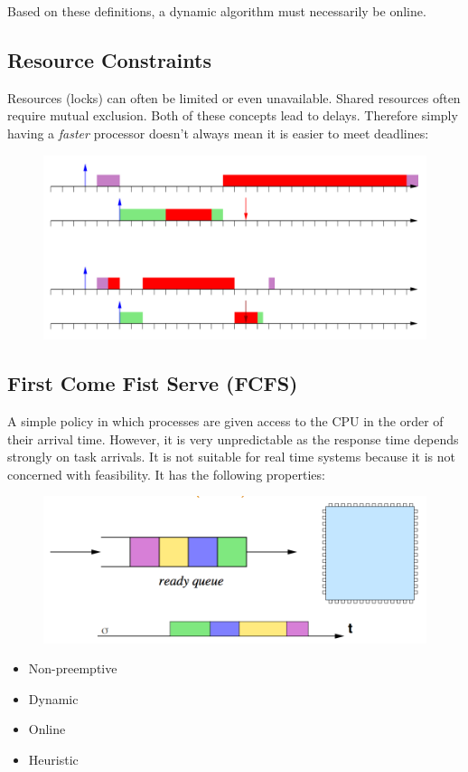 \documentclass{hw}
\begin{document}
Based on these definitions, a dynamic algorithm must necessarily be online. 
\subsection{Resource Constraints}
Resources (locks) can often be limited or even unavailable. Shared resources 
often require mutual exclusion. Both of these concepts lead to delays. Therefore
simply having a \emph{faster} processor doesn't always mean it is easier to meet
deadlines:
\begin{figure}[H]
  \centering
  \includegraphics[scale=.6]{faster}
\end{figure}

\subsection{First Come Fist Serve (FCFS)}
A simple policy in which processes are given access to the CPU in the order of 
their arrival time. However, it is very unpredictable as the response time
depends strongly on task arrivals. It is not suitable for real time systems
because it is not concerned with feasibility. It has the following properties:
\begin{figure}[H]
  \centering
  \includegraphics[scale=.5]{fcfs1}
\end{figure}

\begin{itemize}
  \item Non-preemptive
  \item Dynamic
  \item Online
  \item Heuristic
\end{itemize}
\end{document}
